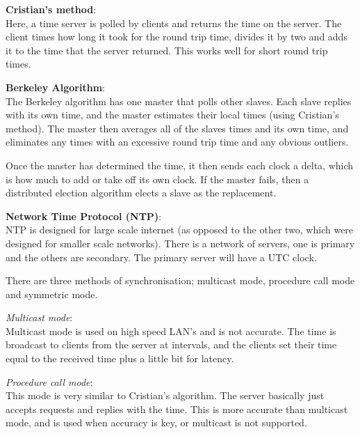 \begin{description}
  \item \textbf{Cristian's method}:\\
    Here, a time server is polled by clients and returns the time on the server.
    The client times how long it took for the round trip time, divides it by two
    and adds it to the time that the server returned. This works well for short
    round trip times.
  \item \textbf{Berkeley Algorithm}:\\
    The Berkeley algorithm has one master that polls other slaves. Each slave 
    replies with its own time, and the master estimates their local times (using
    Cristian's method). The master then averages all of the slaves times and its
    own time, and eliminates any times with an excessive round trip time and any
    obvious outliers.

    Once the master has determined the time, it then sends each clock a delta, 
    which is how much to add or take off its own clock. If the master fails, 
    then a distributed election algorithm elects a slave as the replacement.
  \item \textbf{Network Time Protocol (NTP)}:\\
    NTP is designed for large scale internet (as opposed to the other two, which
    were designed for smaller scale networks). There is a network of servers,
    one is primary and the others are secondary. The primary server will have
    a UTC clock.

    There are three methods of synchronisation; multicast mode, procedure call
    mode and symmetric mode.

    \begin{description}
      \item \textit{Multicast mode}:\\
        Multicast mode is used on high speed LAN's and is not accurate. The time
        is broadcast to clients from the server at intervals, and the clients
        set their time equal to the received time plus a little bit for latency.

      \item \textit{Procedure call mode}:\\
        This mode is very similar to Cristian's algorithm. The server basically
        just accepts requests and replies with the time. This is more accurate
        than multicast mode, and is used when accuracy is key, or multicast is 
        not supported.


\end{description}
\end{description}
